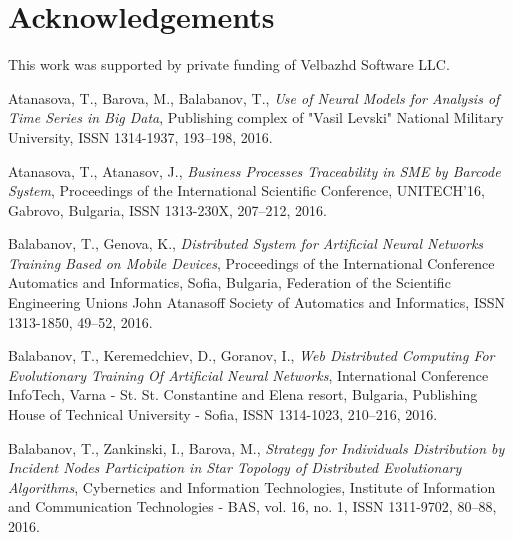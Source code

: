 ﻿\documentclass{llncs}
\begin{document}

\section*{Acknowledgements}

This work was supported by private funding of Velbazhd Software LLC.


\begin{thebibliography}{99}

 Atanasova, T., Barova, M., Balabanov, T., \textit{Use of Neural Models for Analysis of Time Series in Big Data}, Publishing complex of "Vasil Levski" National Military University, ISSN 1314-1937, 193--198, 2016.

 Atanasova, T., Atanasov, J., \textit{Business Processes Traceability in SME by Barcode System}, Proceedings of the International Scientific Conference, UNITECH’16, Gabrovo, Bulgaria, ISSN 1313-230X,  207--212, 2016.

 Balabanov, T., Genova, K., \textit{Distributed System for Artificial Neural Networks Training Based on Mobile Devices}, Proceedings of the International Conference Automatics and Informatics, Sofia, Bulgaria, Federation of the Scientific Engineering Unions John Atanasoff Society of Automatics and Informatics, ISSN 1313-1850, 49--52, 2016.

 Balabanov, T., Keremedchiev, D., Goranov, I., \textit{Web Distributed Computing For Evolutionary Training Of Artificial Neural Networks}, International Conference InfoTech, Varna - St. St. Constantine and Elena resort, Bulgaria, Publishing House of Technical University - Sofia, ISSN 1314-1023, 210--216, 2016.

 Balabanov, T., Zankinski, I., Barova, M., \textit{Strategy for Individuals Distribution by Incident Nodes Participation in Star Topology of Distributed Evolutionary Algorithms}, Cybernetics and Information Technologies, Institute of Information and Communication Technologies - BAS, vol. 16, no. 1, ISSN 1311-9702, 80--88, 2016.


\end{thebibliography}
\end{document}
